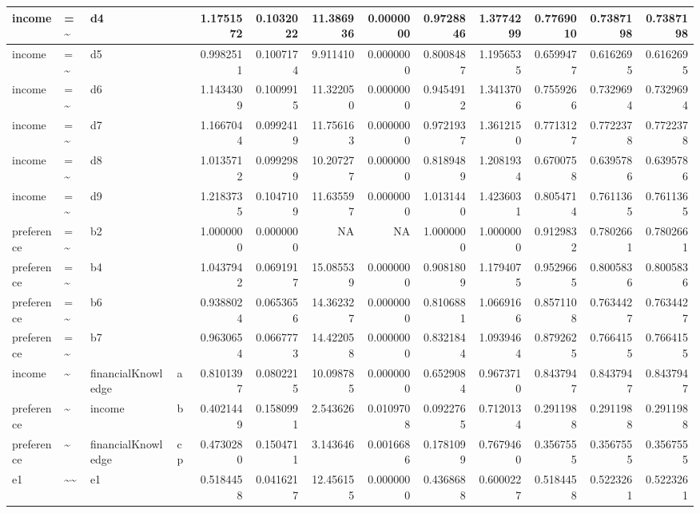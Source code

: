 \documentclass[
  super,
  preprint,
  3p]{elsarticle}
\begin{document}
\begin{tabular}{l|l|l|l|r|r|r|r|r|r|r|r|r}
\hline
income & =\textasciitilde{} & d4 &  & 1.1751572 & 0.1032022 & 11.386936 & 0.0000000 & 0.9728846 & 1.3774299 & 0.7769010 & 0.7387198 & 0.7387198\\
\hline
income & =\textasciitilde{} & d5 &  & 0.9982511 & 0.1007174 & 9.911410 & 0.0000000 & 0.8008487 & 1.1956535 & 0.6599477 & 0.6162695 & 0.6162695\\
\hline
income & =\textasciitilde{} & d6 &  & 1.1434309 & 0.1009915 & 11.322050 & 0.0000000 & 0.9454912 & 1.3413706 & 0.7559266 & 0.7329694 & 0.7329694\\
\hline
income & =\textasciitilde{} & d7 &  & 1.1667044 & 0.0992419 & 11.756163 & 0.0000000 & 0.9721937 & 1.3612150 & 0.7713127 & 0.7722378 & 0.7722378\\
\hline
income & =\textasciitilde{} & d8 &  & 1.0135712 & 0.0992989 & 10.207277 & 0.0000000 & 0.8189489 & 1.2081934 & 0.6700758 & 0.6395786 & 0.6395786\\
\hline
income & =\textasciitilde{} & d9 &  & 1.2183735 & 0.1047109 & 11.635597 & 0.0000000 & 1.0131440 & 1.4236031 & 0.8054714 & 0.7611365 & 0.7611365\\
\hline
preference & =\textasciitilde{} & b2 &  & 1.0000000 & 0.0000000 & NA & NA & 1.0000000 & 1.0000000 & 0.9129832 & 0.7802661 & 0.7802661\\
\hline
preference & =\textasciitilde{} & b4 &  & 1.0437942 & 0.0691917 & 15.085539 & 0.0000000 & 0.9081809 & 1.1794075 & 0.9529665 & 0.8005836 & 0.8005836\\
\hline
preference & =\textasciitilde{} & b6 &  & 0.9388024 & 0.0653656 & 14.362327 & 0.0000000 & 0.8106881 & 1.0669166 & 0.8571108 & 0.7634427 & 0.7634427\\
\hline
preference & =\textasciitilde{} & b7 &  & 0.9630654 & 0.0667773 & 14.422058 & 0.0000000 & 0.8321844 & 1.0939464 & 0.8792625 & 0.7664155 & 0.7664155\\
\hline
income & \textasciitilde{} & financialKnowledge & a & 0.8101397 & 0.0802215 & 10.098785 & 0.0000000 & 0.6529084 & 0.9673710 & 0.8437947 & 0.8437947 & 0.8437947\\
\hline
preference & \textasciitilde{} & income & b & 0.4021449 & 0.1580991 & 2.543626 & 0.0109708 & 0.0922765 & 0.7120134 & 0.2911988 & 0.2911988 & 0.2911988\\
\hline
preference & \textasciitilde{} & financialKnowledge & cp & 0.4730280 & 0.1504711 & 3.143646 & 0.0016686 & 0.1781099 & 0.7679460 & 0.3567555 & 0.3567555 & 0.3567555\\
\hline
e1 & \textasciitilde{}\textasciitilde{} & e1 &  & 0.5184458 & 0.0416217 & 12.456155 & 0.0000000 & 0.4368688 & 0.6000227 & 0.5184458 & 0.5223261 & 0.5223261\\

\end{tabular}
\end{document}
